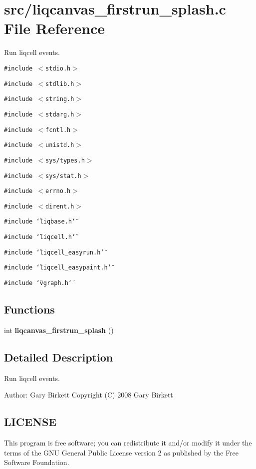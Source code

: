 \section{src/liqcanvas\_\-firstrun\_\-splash.c File Reference}
\label{d3/dcb/liqcanvas__firstrun__splash_8c}
Run liqcell events.  


{\tt \#include $<$stdio.h$>$}\par
{\tt \#include $<$stdlib.h$>$}\par
{\tt \#include $<$string.h$>$}\par
{\tt \#include $<$stdarg.h$>$}\par
{\tt \#include $<$fcntl.h$>$}\par
{\tt \#include $<$unistd.h$>$}\par
{\tt \#include $<$sys/types.h$>$}\par
{\tt \#include $<$sys/stat.h$>$}\par
{\tt \#include $<$errno.h$>$}\par
{\tt \#include $<$dirent.h$>$}\par
{\tt \#include \char`\"{}liqbase.h\char`\"{}}\par
{\tt \#include \char`\"{}liqcell.h\char`\"{}}\par
{\tt \#include \char`\"{}liqcell\_\-easyrun.h\char`\"{}}\par
{\tt \#include \char`\"{}liqcell\_\-easypaint.h\char`\"{}}\par
{\tt \#include \char`\"{}vgraph.h\char`\"{}}\par
\subsection*{Functions}
\begin{CompactItemize}
\item 
int {\bf liqcanvas\_\-firstrun\_\-splash} ()
\end{CompactItemize}


\label{_details}
\subsection{Detailed Description}
Run liqcell events. 

\begin{Desc}
\item[Author:]Gary Birkett Copyright (C) 2008 Gary Birkett\end{Desc}
\subsection{LICENSE}\label{de/d77/liqui_8c_LICENSE}
This program is free software; you can redistribute it and/or modify it under the terms of the GNU General Public License version 2 as published by the Free Software Foundation.

